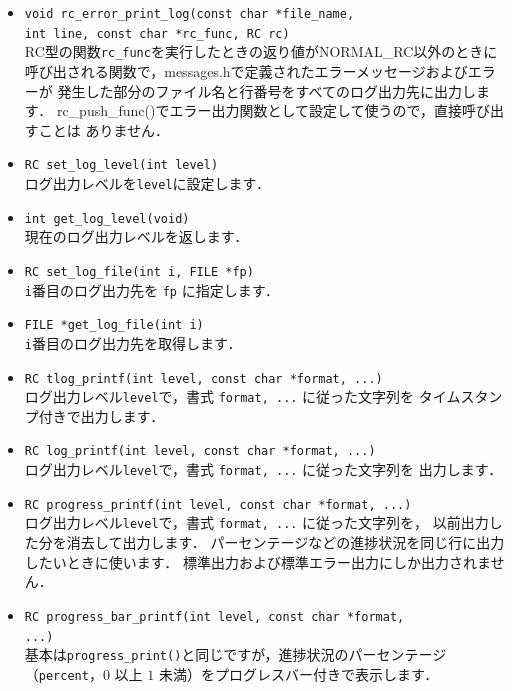 \begin{itemize}
\item \texttt{void rc\_error\_print\_log(const char *file\_name,  \\
	int line, const char *rc\_func, RC rc)} \ \\
RC型の関数\texttt{rc\_func}を実行したときの返り値がNORMAL\_RC以外のときに
呼び出される関数で，messages.hで定義されたエラーメッセージおよびエラーが
発生した部分のファイル名と行番号をすべてのログ出力先に出力します．
rc\_push\_func()でエラー出力関数として設定して使うので，直接呼び出すことは
ありません．

\item \texttt{RC set\_log\_level(int level)} \ \\
ログ出力レベルを\texttt{level}に設定します．

\item \texttt{int get\_log\_level(void)} \ \\
現在のログ出力レベルを返します．

\item \texttt{RC set\_log\_file(int i, FILE *fp)} \ \\
\texttt{i}番目のログ出力先を \texttt{fp} に指定します．

\item \texttt{FILE *get\_log\_file(int i)} \ \\
\texttt{i}番目のログ出力先を取得します．

\item \texttt{RC tlog\_printf(int level, const char *format, ...)} \ \\
ログ出力レベル\texttt{level}で，書式 \texttt{format, ...} に従った文字列を
タイムスタンプ付きで出力します．

\item \texttt{RC log\_printf(int level, const char *format, ...)} \ \\
ログ出力レベル\texttt{level}で，書式 \texttt{format, ...} に従った文字列を
出力します．

\item \texttt{RC progress\_printf(int level, const char *format, ...)} \ \\
ログ出力レベル\texttt{level}で，書式 \texttt{format, ...} に従った文字列を，
以前出力した分を消去して出力します．
パーセンテージなどの進捗状況を同じ行に出力したいときに使います．
標準出力および標準エラー出力にしか出力されません．

\item \texttt{RC progress\_bar\_printf(int level, const char *format, \\ ...)} \ \\
基本は\texttt{progress\_print()}と同じですが，進捗状況のパーセンテージ
（\texttt{percent}，$0$ 以上 $1$ 未満）をプログレスバー付きで表示します．


\end{itemize}
